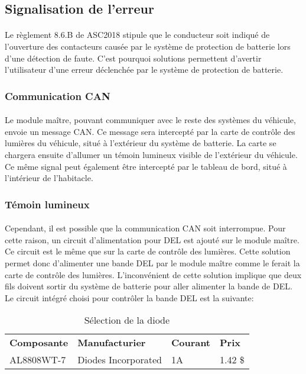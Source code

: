 
\subsection{Signalisation de l'erreur}

	\paragraph*{}
	Le règlement 8.6.B de ASC2018\cite{ASC2018} stipule que le conducteur soit indiqué de l'ouverture des contacteurs causée par le système de protection de batterie lors d'une détection de faute. C'est pourquoi solutions permettent d'avertir l'utilisateur d'une erreur déclenchée par le système de protection de batterie. 
	
	\subsubsection{Communication CAN}
		\paragraph*{}
		Le module maître, pouvant communiquer avec le reste des systèmes du véhicule, envoie un message CAN. Ce message sera intercepté par la carte de contrôle des lumières du véhicule, situé à l'extérieur du système de batterie. La carte se chargera ensuite d'allumer un témoin lumineux visible de l'extérieur du véhicule. Ce même signal peut également être intercepté par le tableau de bord, situé à l'intérieur de l'habitacle.
		
	\subsubsection{Témoin lumineux}
		\paragraph*{}
		Cependant, il est possible que la communication CAN soit interrompue. Pour cette raison, un circuit d'alimentation pour DEL est ajouté sur le module maître. Ce circuit est le même que sur la carte de contrôle des lumières. Cette solution permet donc d'alimenter une bande DEL par le module maître comme le ferait la carte de contrôle des lumières. L'inconvénient de cette solution implique que deux fils doivent sortir du système de batterie pour aller alimenter la bande de DEL. Le circuit intégré choisi pour contrôler la bande DEL est la suivante:
	
	\begin{table}[H]
		\centering
		\caption{Sélection de la diode}
		\label{DiodePrecharge}
		\begin{tabular}{|p{3cm}|p{4cm}|p{2cm}|p{1.5cm}|}
			\hline
			\textbf{Composante} & \textbf{Manufacturier} & \textbf{Courant} & \textbf{Prix}
			\\ \hhline{|=|=|=|=|}
			AL8808WT-7 & Diodes Incorporated  & 1A & 1.42 \$ \\ \hline		
		\end{tabular}
	\end{table}		

